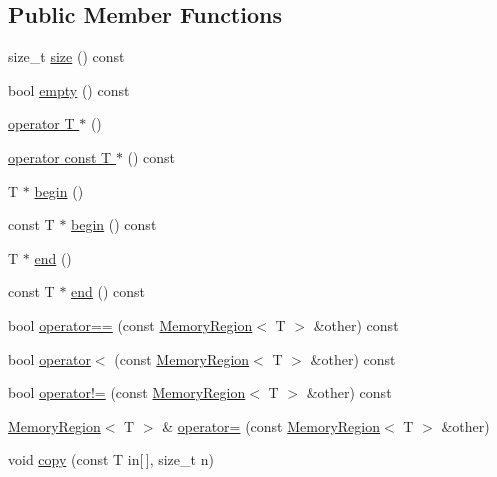 \subsection*{Public Member Functions}
\begin{DoxyCompactItemize}
\item 
size\-\_\-t \hyperlink{classBotan_1_1MemoryRegion_a205679fe758fd920dd50e072090d2963}{size} () const 
\item 
bool \hyperlink{classBotan_1_1MemoryRegion_a225feede6e3456b51b72972baf9f6fa1}{empty} () const 
\item 
\hyperlink{classBotan_1_1MemoryRegion_ad919f88f6063026aab39c9919202eb95}{operator T $\ast$} ()
\item 
\hyperlink{classBotan_1_1MemoryRegion_a6e598b0e5f7feed469b40bde710bf8f8}{operator const T $\ast$} () const 
\item 
T $\ast$ \hyperlink{classBotan_1_1MemoryRegion_ac10c16fd0e2490f8b1ac7e10739af6b2}{begin} ()
\item 
const T $\ast$ \hyperlink{classBotan_1_1MemoryRegion_a5878410bbd4031019a7d5925419d9e94}{begin} () const 
\item 
T $\ast$ \hyperlink{classBotan_1_1MemoryRegion_aede606af0ecfb973e4e95224e8840e05}{end} ()
\item 
const T $\ast$ \hyperlink{classBotan_1_1MemoryRegion_a182cadd0b265c6f478de03f0f578ddd2}{end} () const 
\item 
bool \hyperlink{classBotan_1_1MemoryRegion_adca79b1e7ff030a93c968abbf05110b9}{operator==} (const \hyperlink{classBotan_1_1MemoryRegion}{Memory\-Region}$<$ T $>$ \&other) const 
\item 
bool \hyperlink{classBotan_1_1MemoryRegion_af8ffca8a05b6b38d8d3246ae1c49a6e8}{operator$<$} (const \hyperlink{classBotan_1_1MemoryRegion}{Memory\-Region}$<$ T $>$ \&other) const 
\item 
bool \hyperlink{classBotan_1_1MemoryRegion_a48b9dd20c89ba8f0f8a9fd8994e161f4}{operator!=} (const \hyperlink{classBotan_1_1MemoryRegion}{Memory\-Region}$<$ T $>$ \&other) const 
\item 
\hyperlink{classBotan_1_1MemoryRegion}{Memory\-Region}$<$ T $>$ \& \hyperlink{classBotan_1_1MemoryRegion_a39221d7a5007a180c1c80c7a99fd3ee7}{operator=} (const \hyperlink{classBotan_1_1MemoryRegion}{Memory\-Region}$<$ T $>$ \&other)
\item 
void \hyperlink{classBotan_1_1MemoryRegion_aee6c1661ea3a5ff1ac1b10c999e2ffdf}{copy} (const T in\mbox{[}$\,$\mbox{]}, size\-\_\-t n)
\item 

\end{DoxyCompactItemize}
